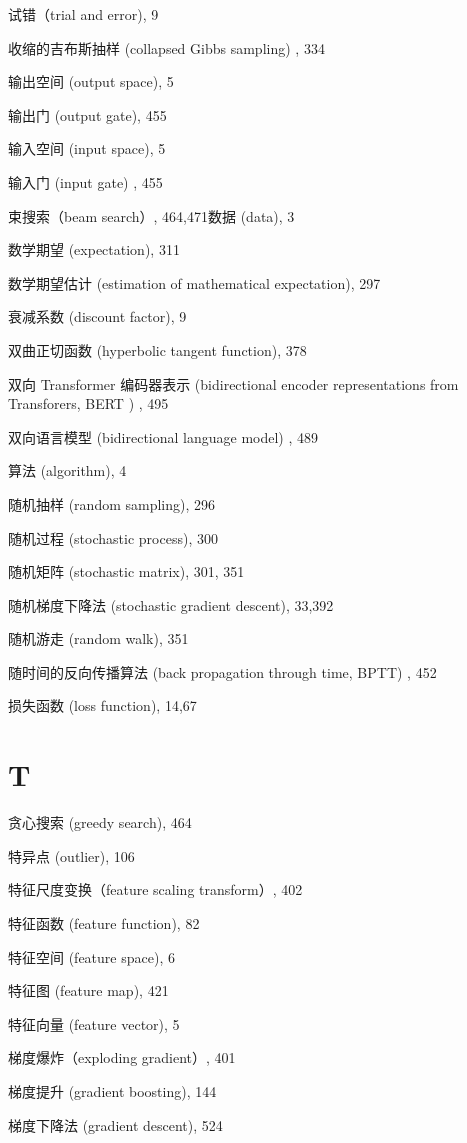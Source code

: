 \documentclass[10pt]{article}
\begin{document}
试错（trial and error), 9

收缩的吉布斯抽样 (collapsed Gibbs sampling) , 334

输出空间 (output space), 5

输出门 (output gate), 455

输入空间 (input space), 5

输入门 (input gate) , 455

束搜索（beam search）, 464,471数据 (data), 3

数学期望 (expectation), 311

数学期望估计 (estimation of mathematical expectation), 297

衰减系数 (discount factor), 9

双曲正切函数 (hyperbolic tangent function), 378

双向 Transformer 编码器表示 (bidirectional encoder representations from Transforers, BERT ) , 495

双向语言模型 (bidirectional language model) , 489

算法 (algorithm), 4

随机抽样 (random sampling), 296

随机过程 (stochastic process), 300

随机矩阵 (stochastic matrix), 301, 351

随机梯度下降法 (stochastic gradient descent), 33,392

随机游走 (random walk), 351

随时间的反向传播算法 (back propagation through time, BPTT) , 452

损失函数 (loss function), 14,67

\section*{T}
贪心搜索 (greedy search), 464

特异点 (outlier), 106

特征尺度变换（feature scaling transform）, 402

特征函数 (feature function), 82

特征空间 (feature space), 6

特征图 (feature map), 421

特征向量 (feature vector), 5

梯度爆炸（exploding gradient）, 401

梯度提升 (gradient boosting), 144

梯度下降法 (gradient descent), 524
\end{document}
